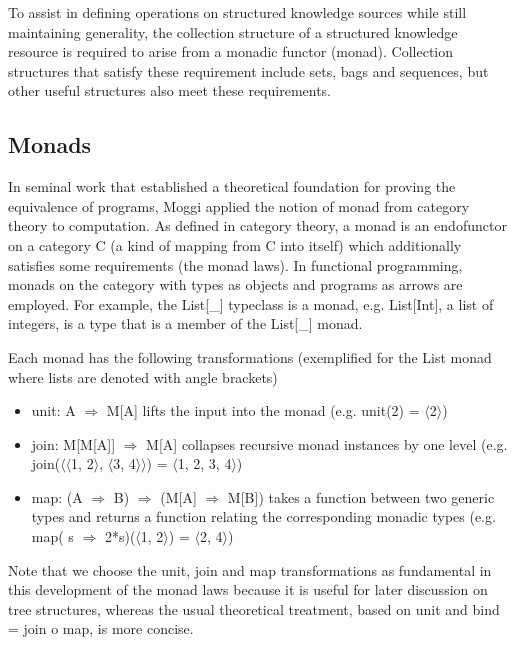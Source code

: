 \documentclass[runningheads]{llncs}
\begin{document}
To assist in defining operations on structured knowledge sources while still maintaining generality, the collection structure of a structured knowledge resource is required to arise from a monadic functor (monad). Collection structures that satisfy these requirement include sets, bags and sequences, but other useful structures also meet these requirements.

\vspace{-0.3cm}
\subsection{Monads}
In seminal work that established a theoretical foundation for proving the equivalence of programs, Moggi\cite{moggi_notions_1991} applied the notion of monad from category theory\cite{MacLane1998} to computation.
As defined in category theory, a monad  is an endofunctor on a category C (a kind of mapping from C into itself) which additionally satisfies some requirements (the monad laws).
In functional programming, monads on the category with types as objects and programs as arrows are employed.
For example, the List[\_] typeclass is a monad, e.g. List[Int], a list of integers, is a type that is a member of the List[\_] monad.

Each monad has the following transformations (exemplified for the List monad where lists are denoted with angle brackets)
\begin{itemize}
\item unit: A $\Rightarrow$ M[A] lifts the input into the monad (e.g. unit(2) = $\langle$2$\rangle$)
\item join: M[M[A]] $\Rightarrow$ M[A] collapses recursive monad instances by one level (e.g. join($\langle$$\langle$1, 2$\rangle$, $\langle$3, 4$\rangle$$\rangle$) = $\langle$1, 2, 3, 4$\rangle$)
\item map: (A $\Rightarrow$ B) $\Rightarrow$ (M[A] $\Rightarrow$ M[B]) takes a function between two generic types and returns a function relating the corresponding monadic types (e.g. map( s $\Rightarrow$ 2*s)($\langle$1, 2$\rangle$) = $\langle$2, 4$\rangle$)
\end{itemize}
Note that we choose the unit, join and map transformations\cite{Wadler1992} as fundamental in this development of the monad laws because it is useful for later discussion on tree structures, whereas the usual theoretical treatment, based on unit and bind = join o map, is more concise.
\end{document}
